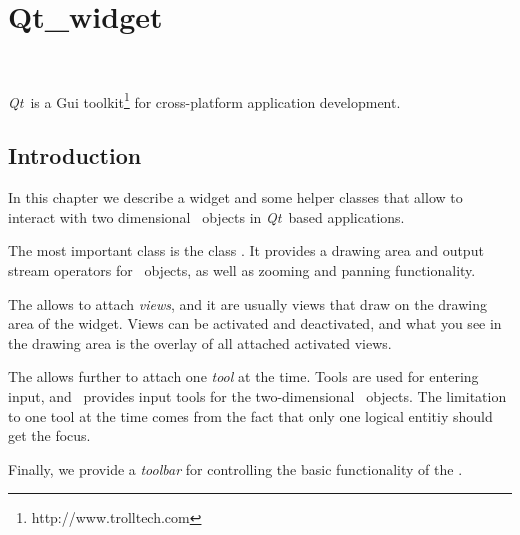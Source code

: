 
\newcommand{\qt}{{\em Qt}}	%

\gdef\lciIfHtmlClassLinks{\lcFalse}
\gdef\lciIfHtmlRefLinks{\lcFalse}
\gdef\lciIfHtmlLinks{\lcFalse}

\chapter{Qt\_widget}
\label{chapterQtwidget}

\\

\qt\ is a {\sc Gui} toolkit\footnote{http://www.trolltech.com} for
cross-platform application development. 

\section{Introduction}

In this chapter we describe a widget and some helper classes that
allow to interact with two dimensional \cgal\ objects in \qt\ based applications.

The most important class is the class . It provides
a drawing area and output stream operators for \cgal\ objects, as well
as zooming and panning functionality.

The  allows to attach {\em views}, and
it are usually views that draw on the drawing area of the widget.
Views can be activated and deactivated, and what you see in the drawing area
is the overlay of all attached activated views.

The  allows further to attach one {\em tool} at the time. 
Tools are used for entering input, and \cgal\ provides input tools for the
two-dimensional \cgal\ objects. The limitation to one tool at the time comes
from the fact that only one logical entitiy should get the focus.

Finally, we provide a {\em toolbar} for controlling the basic functionality
of the .

